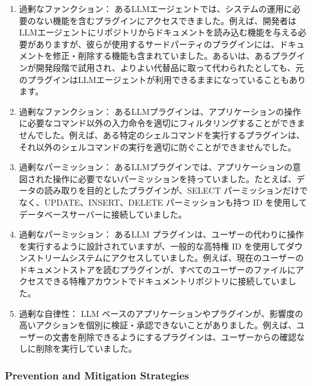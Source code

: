 \documentclass[
]{article}
\providecommand{\tightlist}{%
  \setlength{\itemsep}{0pt}\setlength{\parskip}{0pt}}
\begin{document}
\begin{enumerate}
\def\labelenumi{\arabic{enumi}.}
\tightlist
\item
  過剰なファンクション：
  あるLLMエージェントでは、システムの運用に必要のない機能を含むプラグインにアクセスできました。例えば、開発者はLLMエージェントにリポジトリからドキュメントを読み込む機能を与える必要がありますが、彼らが使用するサードパーティのプラグインには、ドキュメントを修正・削除する機能も含まれていました。あるいは、あるプラグインが開発段階で試用され、よりよい代替品に取って代わられたとしても、元のプラグインはLLMエージェントが利用できるままになっていることもあります。
\item
  過剰なファンクション：
  あるLLMプラグインは、アプリケーションの操作に必要なコマンド以外の入力命令を適切にフィルタリングすることができませんでした。例えば、ある特定のシェルコマンドを実行するプラグインは、それ以外のシェルコマンドの実行を適切に防ぐことができませんでした。
\item
  過剰なパーミッション：
  あるLLMプラグインでは、アプリケーションの意図された操作に必要でないパーミッションを持っていました。たとえば、データの読み取りを目的としたプラグインが、SELECT
  パーミッションだけでなく、UPDATE、INSERT、DELETE パーミッションも持つ
  ID を使用してデータベースサーバーに接続していました。
\item
  過剰なパーミッション： あるLLM
  プラグインは、ユーザーの代わりに操作を実行するように設計されていますが、一般的な高特権
  ID
  を使用してダウンストリームシステムにアクセスしていました。例えば、現在のユーザーのドキュメントストアを読むプラグインが、すべてのユーザーのファイルにアクセスできる特権アカウントでドキュメントリポジトリに接続していました。
\item
  過剰な自律性： LLM
  ベースのアプリケーションやプラグインが、影響度の高いアクションを個別に検証・承認できないことがありました。例えば、ユーザーの文書を削除できるようにするプラグインは、ユーザーからの確認なしに削除を実行していました。
\end{enumerate}

\subsubsection{Prevention and Mitigation
Strategies}\label{prevention-and-mitigation-strategies}
\end{document}
